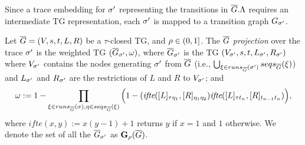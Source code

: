 Since a trace embedding for $\nonlogtrace$ representing the transitions in $\closed{\tg}.\Lambda$ requires an intermediate 
TG representation, each $\nonlogtrace$ is mapped to a transition graph $\tg_\nonlogtrace$.
%
\begin{definition}
Let $\closed{G}=(V,s,t,L,R)$ be a $\tau$-closed TG, and $\pmin\in(0,1]$. The $\closed{G}$ \emph{projection} over the trace 
$\nonlogtrace$ is the weighted TG $(\closed{G}_\nonlogtrace,\omega)$, where $\closed{G}_\nonlogtrace$ is the TG 
$(V_\nonlogtrace,s,t,L_\nonlogtrace,R_\nonlogtrace)$ where
$V_\nonlogtrace$ contains the nodes generating $\nonlogtrace$ from $\closed{G}$	
	(i.e., $\bigcup_{\xi\in\runs{\nonlogtrace}{\closed{G}}}\seqs{\xi}{ \closed{G}}$) and
$L_\nonlogtrace$ and $R_\nonlogtrace$ are the restrictions of $L$ and $R$ to $V_\nonlogtrace$; and
$$\omega := 1-\prod_{\xi\in\runs{\sigma}{\closed{G}},\eta\in\seqs{\xi}{\closed{G}}}\Big(1-(\textit{ifte}([L]_{\tau\eta_1},[R]_{\eta_1\eta_2})\textit{ifte}([L]_{\tau t_n},[R]_{t_{n-1} t_n})\Big),$$
	where $\textit{ifte}(x,y):=x(y-1)+1$ returns $y$ if $x=1$ and $1$ otherwise. We denote the set of all the $\closed{G}_\nonlogtrace$ as $\TBf{\pmin}{4}(\closed{G})$.
%		
\end{definition}
%	

